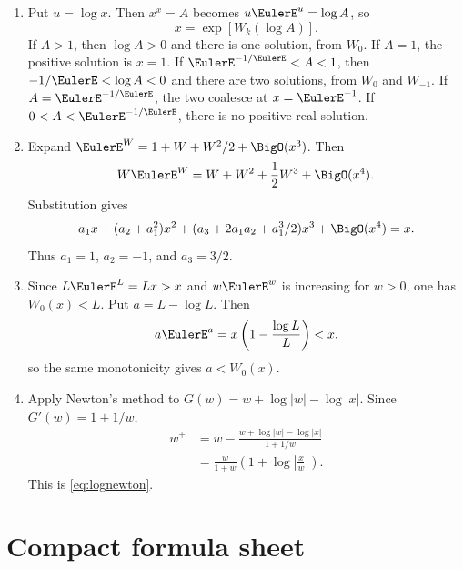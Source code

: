 \documentclass[11pt]{article}
\theoremstyle{remark}
\begin{document}
\begin{enumerate}[label=\textbf{S\arabic*.},leftmargin=*]
\item Put \(u=\log x\).  Then \(x^x=A\) becomes
\(u\EulerE^u=\log A\), so
\[
       x=\exp[W_k(\log A)].
\]
If \(A>1\), then \(\log A>0\) and there is one solution, from \(W_0\).
If \(A=1\), the positive solution is \(x=1\).  If
\(\EulerE^{-1/\EulerE}<A<1\), then \(-1/\EulerE<\log A<0\) and there are two
solutions, from \(W_0\) and \(W_{-1}\).  If
\(A=\EulerE^{-1/\EulerE}\), the two coalesce at \(x=\EulerE^{-1}\).  If
\(0<A<\EulerE^{-1/\EulerE}\), there is no positive real solution.

\item Expand \(\EulerE^W=1+W+W^2/2+\BigO(x^3)\).  Then
\[
 W\EulerE^W=W+W^2+\frac12W^3+\BigO(x^4).
\]
Substitution gives
\[
 a_1x+(a_2+a_1^2)x^2+
 (a_3+2a_1a_2+a_1^3/2)x^3+\BigO(x^4)=x.
\]
Thus \(a_1=1\), \(a_2=-1\), and \(a_3=3/2\).

\item Since \(L\EulerE^L=Lx>x\) and \(w\EulerE^w\) is increasing for
\(w>0\), one has \(W_0(x)<L\).  Put \(a=L-\log L\).  Then
\[
       a\EulerE^a=x\left(1-\frac{\log L}{L}\right)<x,
\]
so the same monotonicity gives \(a<W_0(x)\).

\item Apply Newton's method to
\(G(w)=w+\log|w|-\log|x|\).  Since \(G'(w)=1+1/w\),
\begin{align*}
 w^+&=w-\frac{w+\log|w|-\log|x|}{1+1/w}\\
 &=\frac{w}{1+w}\left(1+\log\left|\frac{x}{w}\right|\right).
\end{align*}
This is \eqref{eq:lognewton}.
\end{enumerate}

\section{Compact formula sheet}\label{app:formula-sheet}
\end{document}
